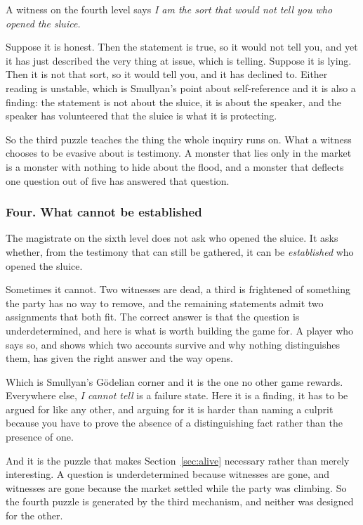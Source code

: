\documentclass[11pt,a4paper]{article}
\begin{document}
A witness on the fourth level says \emph{I am the sort that would not tell you who opened the
sluice.}

Suppose it is honest. Then the statement is true, so it would not tell you, and yet it has just
described the very thing at issue, which is telling. Suppose it is lying. Then it is not that sort,
so it would tell you, and it has declined to. Either reading is unstable, which is Smullyan's
point about self-reference and it is also a finding: the statement is not about the sluice, it is
about the speaker, and the speaker has volunteered that the sluice is what it is protecting.

\begin{sectionbox}
So the third puzzle teaches the thing the whole inquiry runs on. What a witness chooses to be
evasive about is testimony. A monster that lies only in the market is a monster with nothing to
hide about the flood, and a monster that deflects one question out of five has answered that
question.
\end{sectionbox}

\subsubsection*{Four. What cannot be established}

The magistrate on the sixth level does not ask who opened the sluice. It asks whether, from the
testimony that can still be gathered, it can be \emph{established} who opened the sluice.

Sometimes it cannot. Two witnesses are dead, a third is frightened of something the party has no
way to remove, and the remaining statements admit two assignments that both fit. The correct answer
is that the question is underdetermined, and here is what is worth building the game for. A player
who says so, and shows which two accounts survive and why nothing distinguishes them, has given the
right answer and the way opens.

\begin{alarmbox}
Which is Smullyan's Gödelian corner and it is the one no other game rewards. Everywhere else,
\emph{I cannot tell} is a failure state. Here it is a finding, it has to be argued for like any
other, and arguing for it is harder than naming a culprit because you have to prove the absence of
a distinguishing fact rather than the presence of one.
\end{alarmbox}

And it is the puzzle that makes Section~\ref{sec:alive} necessary rather than merely interesting. A
question is underdetermined because witnesses are gone, and witnesses are gone because the market
settled while the party was climbing. So the fourth puzzle is generated by the third mechanism, and
neither was designed for the other.
\end{document}

